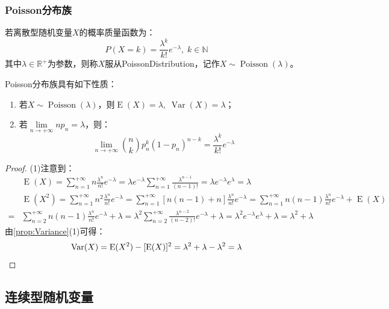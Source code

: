 \subsubsection{Poisson分布族}
\begin{definition}
	若离散型随机变量$X$的概率质量函数为：
	\begin{equation*}
		P(X=k)=\frac{\lambda^k}{k!}e^{-\lambda},\;k\in\mathbb{N}
	\end{equation*}
	其中$\lambda\in\mathbb{R}^{+}$为参数，则称$X$服从\gls{PoissonDistribution}，记作$X\sim\operatorname{Poisson}(\lambda)$。
\end{definition}
\begin{property}
	Poisson分布族具有如下性质：
	\begin{enumerate}
		\item 若$X\sim\operatorname{Poisson}(\lambda)$，则$\operatorname{E}(X)=\lambda,\;\operatorname{Var}(X)=\lambda$；
		\item 若$\lim\limits_{n\to+\infty}np_n=\lambda$，则：
		\begin{equation*}
			\lim_{n\to+\infty}\binom{n}{k}p_n^k(1-p_n)^{n-k}=\frac{\lambda^k}{k!}e^{-\lambda}
		\end{equation*}
	\end{enumerate}
\end{property}
\begin{proof}
	(1)注意到：
	\begin{align*}
		&\operatorname{E}(X)=\sum_{n=1}^{+\infty}n\frac{\lambda^n}{n!}e^{-\lambda}=\lambda e^{-\lambda}\sum_{n=1}^{+\infty}\frac{\lambda^{n-1}}{(n-1)!}=\lambda e^{-\lambda}e^{\lambda}=\lambda \\
		&\operatorname{E}(X^2)=\sum_{n=1}^{+\infty}n^2\frac{\lambda^n}{n!}e^{-\lambda}=\sum_{n=1}^{+\infty}[n(n-1)+n]\frac{\lambda^n}{n!}e^{-\lambda}=\sum_{n=1}^{+\infty}n(n-1)\frac{\lambda^n}{n!}e^{-\lambda}+\operatorname{E}(X) \\
		=&\sum_{n=2}^{+\infty}n(n-1)\frac{\lambda^n}{n!}e^{-\lambda}+\lambda=\lambda^2\sum_{n=2}^{+\infty}\frac{\lambda^{n-2}}{(n-2)!}e^{-\lambda}+\lambda=\lambda^2e^{-\lambda}e^{\lambda}+\lambda=\lambda^2+\lambda
	\end{align*}
	由\cref{prop:Variance}(1)可得：
	\begin{equation*}
		\operatorname{Var}(X)=\operatorname{E}(X^2)-[\operatorname{E}(X)]^2=\lambda^2+\lambda-\lambda^2=\lambda\qedhere
	\end{equation*}
\end{proof}

\subsection{连续型随机变量}
